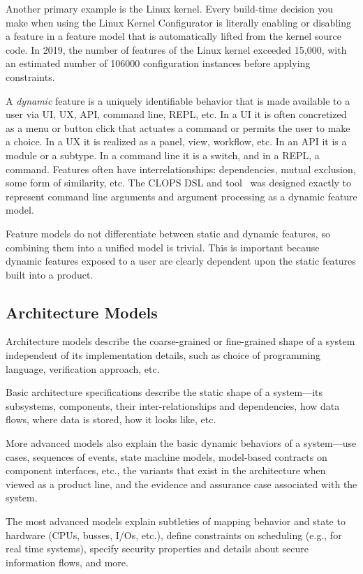 \documentclass[10pt,letterpaper]{article}
\begin{document}
Another primary example is the Linux kernel. Every build-time decision you make when using the Linux Kernel Configurator is literally enabling or disabling a feature in a feature model that is automatically lifted from the kernel source code. In 2019, the number of features of the Linux kernel exceeded 15,000, with an estimated number of 106000 configuration instances before applying constraints.

A \emph{dynamic} feature is a uniquely identifiable behavior that is made available to a user via UI, UX, API, command line, REPL, etc. In a UI it is often concretized as a menu or button click that actuates a command or permits the user to make a choice. In a UX it is realized as a panel, view, workflow, etc. In an API it is a module or a subtype. In a command line it is a switch, and in a REPL, a command. Features often have interrelationships: dependencies, mutual exclusion, some form of similarity, etc. The CLOPS DSL and tool~\cite{JanotaEtAlCLOPSDSL2009} was designed exactly to represent command line arguments and argument processing as a dynamic feature model.

Feature models do not differentiate between static and dynamic features, so combining them into a unified model is trivial. This is important because dynamic features exposed to a user are clearly dependent upon the static features built into a product.

\subsection{Architecture Models}
\label{architecture-models}

Architecture models describe the coarse-grained or fine-grained shape of a system independent of its implementation details, such as choice of programming language, verification approach, etc.

Basic architecture specifications describe the static shape of a system---its subsystems, components, their inter-relationships and dependencies, how data flows, where data is stored, how it looks like, etc.

More advanced models also explain the basic dynamic behaviors of a system---use cases, sequences of events, state machine models, model-based contracts on component interfaces, etc., the variants that exist in the architecture when viewed as a product line, and the evidence and assurance case associated with the system.

The most advanced models explain subtleties of mapping behavior and state to hardware (CPUs, busses, I/Os, etc.), define constraints on scheduling (e.g., for real time systems), specify security properties and details about secure information flows, and more.
\end{document}
